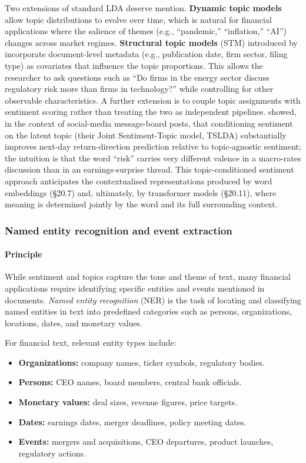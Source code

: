 Two extensions of standard LDA deserve mention. \textbf{Dynamic topic models} \citep{blei2006dynamic} allow topic distributions to evolve over time, which is natural for financial applications where the salience of themes (e.g., ``pandemic,'' ``inflation,'' ``AI'') changes across market regimes. \textbf{Structural topic models} (STM) introduced by \cite{roberts2014structural} incorporate document-level metadata (e.g., publication date, firm sector, filing type) as covariates that influence the topic proportions. This allows the researcher to ask questions such as ``Do firms in the energy sector discuss regulatory risk more than firms in technology?'' while controlling for other observable characteristics. A further extension is to couple topic assignments with sentiment scoring rather than treating the two as independent pipelines. \cite{nguyen2015topic} showed, in the context of social-media message-board posts, that conditioning sentiment on the latent topic (their Joint Sentiment-Topic model, TSLDA) substantially improves next-day return-direction prediction relative to topic-agnostic sentiment; the intuition is that the word ``risk'' carries very different valence in a macro-rates discussion than in an earnings-surprise thread. This topic-conditioned sentiment approach anticipates the contextualised representations produced by word embeddings (§20.7) and, ultimately, by transformer models (§20.11), where meaning is determined jointly by the word and its full surrounding context.

\subsubsection{Named entity recognition and event extraction}

\paragraph{Principle}

While sentiment and topics capture the tone and theme of text, many financial applications require identifying specific entities and events mentioned in documents. \textit{Named entity recognition} (NER) is the task of locating and classifying named entities in text into predefined categories such as persons, organizations, locations, dates, and monetary values.

For financial text, relevant entity types include:

\begin{itemize}
\item \textbf{Organizations:} company names, ticker symbols, regulatory bodies.
\item \textbf{Persons:} CEO names, board members, central bank officials.
\item \textbf{Monetary values:} deal sizes, revenue figures, price targets.
\item \textbf{Dates:} earnings dates, merger deadlines, policy meeting dates.
\item \textbf{Events:} mergers and acquisitions, CEO departures, product launches, regulatory actions.
\end{itemize}

